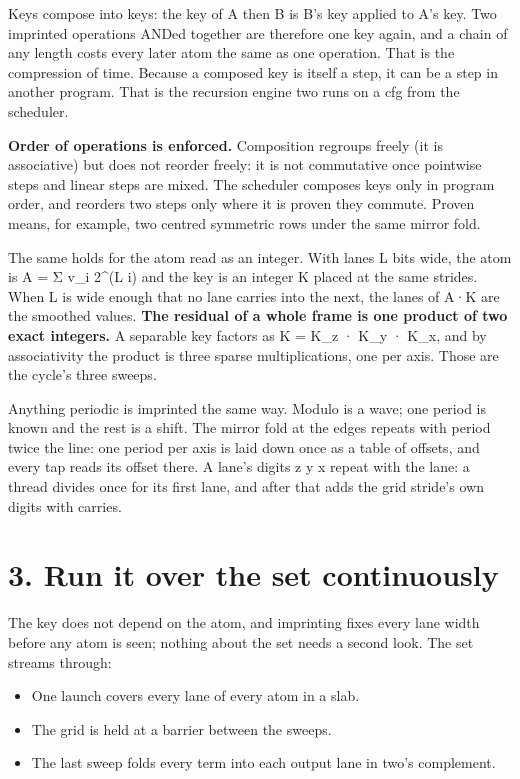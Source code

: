 Keys compose into keys: the key of A then B is B's key applied to A's key. Two imprinted operations ANDed together are therefore one key again, and a chain of any length costs every later atom the same as one operation. That is the compression of time. Because a composed key is itself a step, it can be a step in another program. That is the recursion engine two runs on a cfg from the scheduler.

\textbf{Order of operations is enforced.} Composition regroups freely (it is associative) but does not reorder freely: it is not commutative once pointwise steps and linear steps are mixed. The scheduler composes keys only in program order, and reorders two steps only where it is proven they commute. Proven means, for example, two centred symmetric rows under the same mirror fold.

The same holds for the atom read as an integer. With lanes L bits wide, the atom is A = Σ v\_\allowbreak{}i 2\textasciicircum{}(L i) and the key is an integer K placed at the same strides. When L is wide enough that no lane carries into the next, the lanes of A·K are the smoothed values. \textbf{The residual of a whole frame is one product of two exact integers.} A separable key factors as K = K\_\allowbreak{}z · K\_\allowbreak{}y · K\_\allowbreak{}x, and by associativity the product is three sparse multiplications, one per axis. Those are the cycle's three sweeps.

Anything periodic is imprinted the same way. Modulo is a wave; one period is known and the rest is a shift. The mirror fold at the edges repeats with period twice the line: one period per axis is laid down once as a table of offsets, and every tap reads its offset there. A lane's digits z y x repeat with the lane: a thread divides once for its first lane, and after that adds the grid stride's own digits with carries.

\section{\texorpdfstring{3. Run it over the set continuously}{3. Run it over the set continuously}}

The key does not depend on the atom, and imprinting fixes every lane width before any atom is seen; nothing about the set needs a second look. The set streams through:

\begin{itemize}
\item One launch covers every lane of every atom in a slab.
\item The grid is held at a barrier between the sweeps.
\item The last sweep folds every term into each output lane in two's complement.
\end{itemize}

